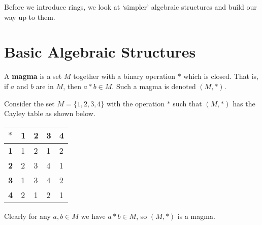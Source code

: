 Before we introduce rings, we look at `simpler' algebraic structures and build our way up to them.

\section{Basic Algebraic Structures}
\begin{definition}
    A \textbf{magma} is a set $M$ together with a binary operation $\ast$ which is closed. That is, if $a$ and $b$ are in $M$, then $a \ast b \in M$. Such a magma is denoted $(M, \ast)$.
\end{definition}
\begin{example}
    Consider the set $M = \{1, 2, 3, 4\}$ with the operation $\ast$ such that $(M, \ast)$ has the Cayley table as shown below.
    \begin{table}[h]
        \centering
        \begin{tabular}{|l|l|l|l|l|}
            \hline
            $\ast$     & \textbf{1} & \textbf{2} & \textbf{3} & \textbf{4} \\ \hline
            \textbf{1} & 1          & 2          & 1          & 2          \\ \hline
            \textbf{2} & 2          & 3          & 4          & 1          \\ \hline
            \textbf{3} & 1          & 3          & 4          & 2          \\ \hline
            \textbf{4} & 2          & 1          & 2          & 1          \\ \hline
        \end{tabular}
    \end{table}
    
    Clearly for any $a, b\in M$ we have $a \ast b \in M$, so $(M, \ast)$ is a magma.
\end{example}

